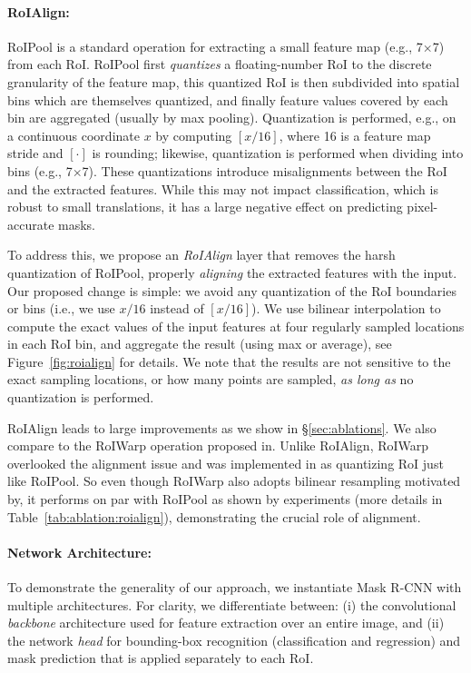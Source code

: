 \paragraph{RoIAlign:} RoIPool is a standard operation for extracting a small feature map (e.g., 7$\times$7) from each RoI. RoIPool first \emph{quantizes} a floating-number RoI to the discrete granularity of the feature map, this quantized RoI is then subdivided into spatial bins which are themselves quantized, and finally feature values covered by each bin are aggregated (usually by max pooling). Quantization is performed, e.g., on a continuous coordinate $x$ by computing $[x/16]$, where 16 is a feature map stride and $[\cdot]$ is rounding; likewise, quantization is performed when dividing into bins (e.g., 7$\times$7). These quantizations introduce misalignments between the RoI and the extracted features. While this may not impact classification, which is robust to small translations, it has a large negative effect on predicting pixel-accurate masks.

To address this, we propose an \emph{RoIAlign} layer that removes the harsh quantization of RoIPool, properly \emph{aligning} the extracted features with the input. Our proposed change is simple: we avoid any quantization of the RoI boundaries or bins (i.e., we use $x/16$ instead of $[x/16]$). We use bilinear interpolation to compute the exact values of the input features at four regularly sampled locations in each RoI bin, and aggregate the result (using max or average), see Figure~\ref{fig:roialign} for details. We note that the results are not sensitive to the exact sampling locations, or how many points are sampled, \emph{as long as} no quantization is performed.

RoIAlign leads to large improvements as we show in \S\ref{sec:ablations}. We also compare to the RoIWarp operation proposed in.
Unlike RoIAlign, RoIWarp overlooked the alignment issue and was implemented in as quantizing RoI just like RoIPool. So even though RoIWarp also adopts bilinear resampling motivated by, it performs on par with RoIPool as shown by experiments (more details in Table~\ref{tab:ablation:roialign}), demonstrating the crucial role of alignment.

\paragraph{Network Architecture:} To demonstrate the generality of our approach, we instantiate Mask R-CNN with multiple architectures. For clarity, we differentiate between: (i) the convolutional \emph{backbone} architecture used for feature extraction over an entire image, and (ii) the network \emph{head} for bounding-box recognition (classification and regression) and mask prediction that is applied separately to each RoI.

